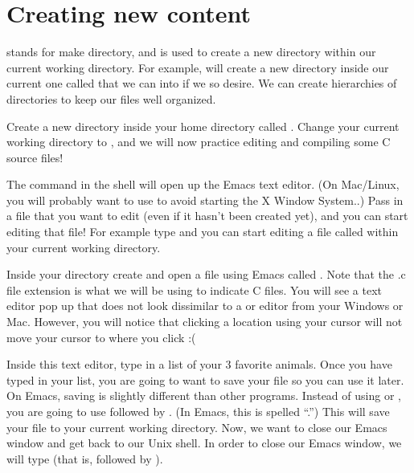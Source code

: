 \documentclass{tufte-handout}
\begin{document}
\section{Creating new content}

 stands for make directory, and is used to create a new
directory within our current working directory. For example,
 will create a new directory inside our
current one called  that we can  into
if we so desire. We can create hierarchies of directories to keep our
files well organized.

Create a new directory inside your home directory called
. Change your current working directory to
, and we will now practice editing and compiling
some C source files!

The  command in the shell will open up the Emacs text%
 editor. (On Mac/Linux, you will probably want to
use  to avoid starting the X Window System..) Pass in
a file that you want to edit (even if it hasn't been created yet), and
you can start editing that file! For example type  and you can start editing a file called
 within your current working directory.

Inside your  directory create and open a file
using Emacs called . Note that the .c file
extension is what we will be using to indicate C files. You will see a
text editor pop up that does not look dissimilar to a
 or  editor from your
Windows or Mac. However, you will notice that clicking a location using
your cursor will not move your cursor to where you click :(

Inside this text editor, type in a list of your 3 favorite animals. Once
you have typed in your list, you are going to want to save your file so
you can use it later. On Emacs, saving is slightly different than other
programs. Instead of using  or , you
are going to use  followed by
.
(In Emacs, this is spelled ``.'') This will save your
file to your current working directory. Now, we want to close our Emacs
window and get back to our Unix shell. In order to close our Emacs
window, we will type  (that is, 
followed by ).
\end{document}
